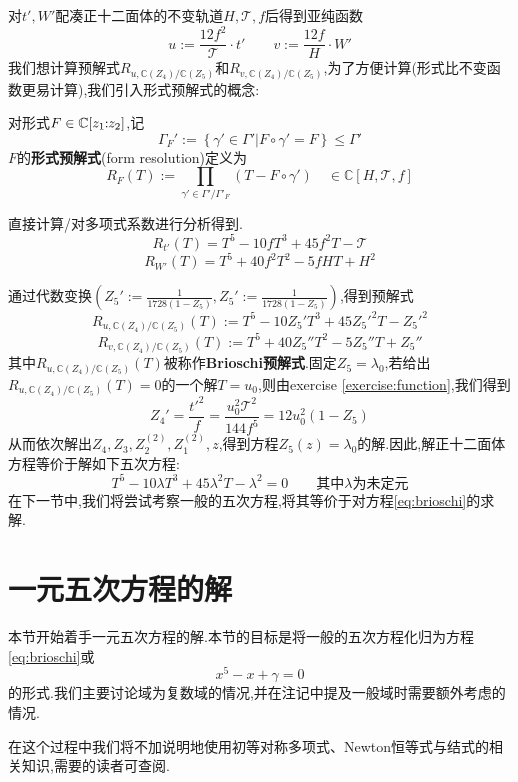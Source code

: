对$t',W'$配凑正十二面体的不变轨道$H,\mathcal{T},f$后得到亚纯函数
$$u:=\frac{12f^2}{\mathcal{T}} \cdot t' \qquad v:=\frac{12f}{H} \cdot W'$$
我们想计算预解式$R_{u,\mathbb{C}(Z_4)/\mathbb{C}(Z_5)}$和$R_{v,\mathbb{C}(Z_4)/\mathbb{C}(Z_5)}$,为了方便计算(形式比不变函数更易计算),我们引入形式预解式的概念:
\begin{defn}
	对形式$F \in \mathbb{C}[z_1\hspace{-3pt}:\hspace{-3pt}z_2]$,记
	$$\Gamma_F':= \left\{ \gamma' \in \Gamma'|F \circ \gamma' = F \right\} \leqslant \Gamma'$$
	$F$的\textbf{形式预解式}(form resolution)定义为
	$$R_F(T):= \prod_{\gamma' \in \Gamma' / \Gamma'_F}(T-F \circ \gamma') 	\quad \in \mathbb{C}[H,\mathcal{T},f]$$
\end{defn}
\begin{example1}
	直接计算/对多项式系数进行分析得到\footnotemark.
	$$R_{t'}(T)=T^5-10fT^3+45f^2T-\mathcal{T}$$
	$$R_{W'}(T)=T^5+40f^2T^2-5fHT+H^2$$
\end{example1}

通过代数变换$\left(\displaystyle Z_5':= \frac{1}{1728(1-Z_5)},Z_5':= \frac{1}{1728(1-Z_5)}\right)$,得到预解式
$$R_{u,\mathbb{C}(Z_4)/\mathbb{C}(Z_5)}(T):=T^5-10Z_5'T^3+45{Z_5'}^2T-{Z_5'}^2$$
$$R_{v,\mathbb{C}(Z_4)/\mathbb{C}(Z_5)}(T):=T^5+40Z_5''T^2-5Z_5''T+Z_5''$$
其中$R_{u,\mathbb{C}(Z_4)/\mathbb{C}(Z_5)}(T)$被称作\textbf{Brioschi预解式}.固定$Z_5=\lambda_0$,若给出$R_{u,\mathbb{C}(Z_4)/\mathbb{C}(Z_5)}(T)=0$的一个解$T=u_0$,则由exercise \ref{exercise:function},我们得到
$$Z_4'=\frac{t'^2}{f}=\frac{u_0^2\mathcal{T}^2}{144f^5}=12u_0^2(1-Z_5)$$
从而依次解出$Z_4,Z_3,Z_2^{(2)},Z_1^{(2)},z$,得到方程$Z_5(z)=\lambda_0$的解.因此,解正十二面体方程等价于解如下五次方程:
\begin{equation}\label{eq:brioschi}
T^5-10\lambda T^3 +45\lambda^2T-\lambda^2=0	\qquad \text{其中$\lambda$为未定元}
\end{equation}
在下一节中,我们将尝试考察一般的五次方程,将其等价于对方程\eqref{eq:brioschi}的求解.
\section{一元五次方程的解}
本节开始着手一元五次方程的解.本节的目标是将一般的五次方程化归为方程\eqref{eq:brioschi}或
\begin{equation}\label{eq:Bring-Jarrard}
x^5-x+\gamma=0
\end{equation}
的形式.我们主要讨论域为复数域的情况,并在注记中提及一般域时需要额外考虑的情况.

在这个过程中我们将不加说明地使用初等对称多项式、Newton恒等式与结式的相关知识,需要的读者可查阅\cite[Chapter 5.1-5.3]{shurman1997geometry}.

